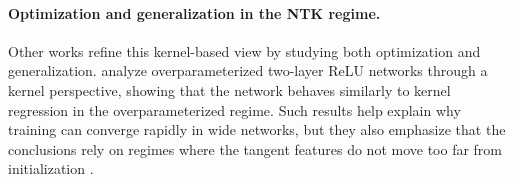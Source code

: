 \paragraph{Optimization and generalization in the NTK regime.}
Other works refine this kernel-based view by studying both optimization and
generalization. \citet{arora2019finegrainedanalysisoptimizationgeneralization}
analyze overparameterized two-layer ReLU networks through a kernel perspective,
showing that the network behaves similarly to kernel regression in the
overparameterized regime. Such results help explain why training can converge
rapidly in wide networks, but they also emphasize that the conclusions rely on
regimes where the tangent features do not move too far from initialization
\citep{arora2019finegrainedanalysisoptimizationgeneralization,lee2020wide}.

